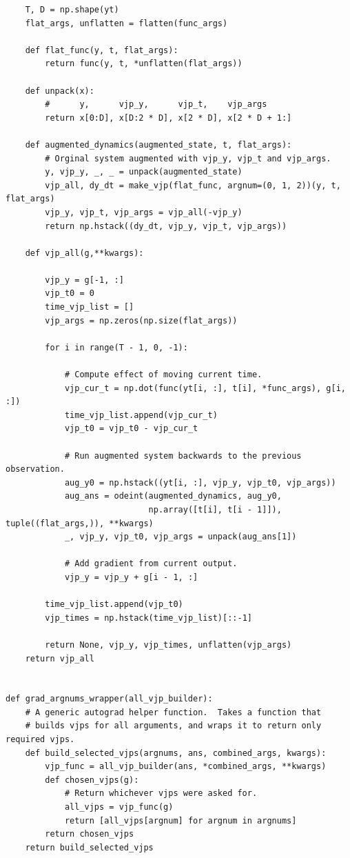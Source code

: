 \documentclass{article}
\begin{document}
\begin{appendices}
\begin{lstlisting}
    T, D = np.shape(yt)
    flat_args, unflatten = flatten(func_args)

    def flat_func(y, t, flat_args):
        return func(y, t, *unflatten(flat_args))

    def unpack(x):
        #      y,      vjp_y,      vjp_t,    vjp_args
        return x[0:D], x[D:2 * D], x[2 * D], x[2 * D + 1:]

    def augmented_dynamics(augmented_state, t, flat_args):
        # Orginal system augmented with vjp_y, vjp_t and vjp_args.
        y, vjp_y, _, _ = unpack(augmented_state)
        vjp_all, dy_dt = make_vjp(flat_func, argnum=(0, 1, 2))(y, t, flat_args)
        vjp_y, vjp_t, vjp_args = vjp_all(-vjp_y)
        return np.hstack((dy_dt, vjp_y, vjp_t, vjp_args))

    def vjp_all(g,**kwargs):

        vjp_y = g[-1, :]
        vjp_t0 = 0
        time_vjp_list = []
        vjp_args = np.zeros(np.size(flat_args))

        for i in range(T - 1, 0, -1):

            # Compute effect of moving current time.
            vjp_cur_t = np.dot(func(yt[i, :], t[i], *func_args), g[i, :])
            time_vjp_list.append(vjp_cur_t)
            vjp_t0 = vjp_t0 - vjp_cur_t

            # Run augmented system backwards to the previous observation.
            aug_y0 = np.hstack((yt[i, :], vjp_y, vjp_t0, vjp_args))
            aug_ans = odeint(augmented_dynamics, aug_y0,
                             np.array([t[i], t[i - 1]]), tuple((flat_args,)), **kwargs)
            _, vjp_y, vjp_t0, vjp_args = unpack(aug_ans[1])

            # Add gradient from current output.
            vjp_y = vjp_y + g[i - 1, :]

        time_vjp_list.append(vjp_t0)
        vjp_times = np.hstack(time_vjp_list)[::-1]

        return None, vjp_y, vjp_times, unflatten(vjp_args)
    return vjp_all


def grad_argnums_wrapper(all_vjp_builder):
    # A generic autograd helper function.  Takes a function that
    # builds vjps for all arguments, and wraps it to return only required vjps.
    def build_selected_vjps(argnums, ans, combined_args, kwargs):
        vjp_func = all_vjp_builder(ans, *combined_args, **kwargs)
        def chosen_vjps(g):
            # Return whichever vjps were asked for.
            all_vjps = vjp_func(g)
            return [all_vjps[argnum] for argnum in argnums]
        return chosen_vjps
    return build_selected_vjps


\end{lstlisting}
\end{appendices}
\end{document}
